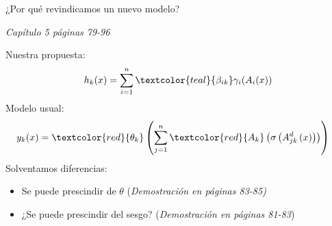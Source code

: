 \documentclass{beamer}
\begin{document}
\begin{frame}{¿Por qué revindicamos un nuevo modelo?}
    \begin{flushright}
        \textit{Capítulo 5 páginas 79-96}
    \end{flushright}
    Nuestra propuesta: 
    \begin{align*}
                h_k(x) = 
                \sum_{i=1}^{n} \textcolor{teal}{\beta_{i k}} \gamma_{i}( A_{i}(x))
    \end{align*}
    Modelo usual:
    \begin{align*}
        y_k(x) &= 
        \textcolor{red}{\theta_k}
        \left( 
            \sum^n_{j=1} \textcolor{red}{A_{k}}
            \left(
                \sigma 
                \left(
                    A^{d}_{j k}
                    \left(
                        x
                    \right)
                \right)
            \right)
        \right)
    \end{align*}
    Solventamos diferencias: 
    \begin{itemize}
        \item Se puede prescindir de $\theta$ (\textit{Demostración en páginas 83-85)}
        \item ¿Se puede prescindir del sesgo? (\textit{Demostración en páginas 81-83})
    \end{itemize}
\end{frame}
\end{document}
